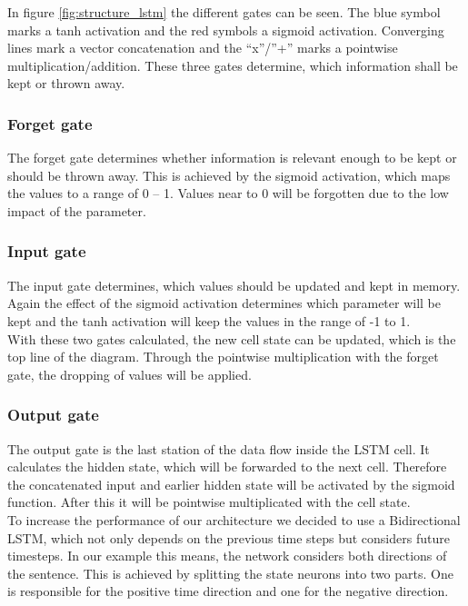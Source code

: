 \documentclass[conference]{IEEEtran}
\begin{document}
In figure \ref{fig:structure_lstm} the different gates can be seen. The blue symbol marks a tanh activation and the red symbols a sigmoid activation. Converging lines mark a vector concatenation and the “x”/”+” marks a pointwise multiplication/addition. These three gates determine, which information shall be kept or thrown away. 

\subsubsection{Forget gate}

The forget gate determines whether information is relevant enough to be kept or should be thrown away. This is achieved by the sigmoid activation, which maps the values to a range of 0 – 1. Values near to 0 will be forgotten due to the low impact of the parameter.

\subsubsection{Input gate}

The input gate determines, which values should be updated and kept in memory. Again the effect of the sigmoid activation determines which parameter will be kept and the tanh activation will keep the values in the range of -1 to 1.\\
With these two gates calculated, the new cell state can be updated, which is the top line of the diagram. Through the pointwise multiplication with the forget gate, the dropping of values will be applied.

\subsubsection{Output gate}

The output gate is the last station of the data flow inside the LSTM cell. It calculates the hidden state, which will be forwarded to the next cell. Therefore the concatenated input and earlier hidden state will be activated by the sigmoid function. After this it will be pointwise multiplicated with the cell state.\\
To increase the performance of our architecture we decided to use a Bidirectional LSTM, which not only depends on the previous time steps but considers future timesteps. In our example this means, the network considers both directions of the sentence. This is achieved by splitting the state neurons into two parts. One is responsible for the positive time direction and one for the negative direction.
\end{document}
